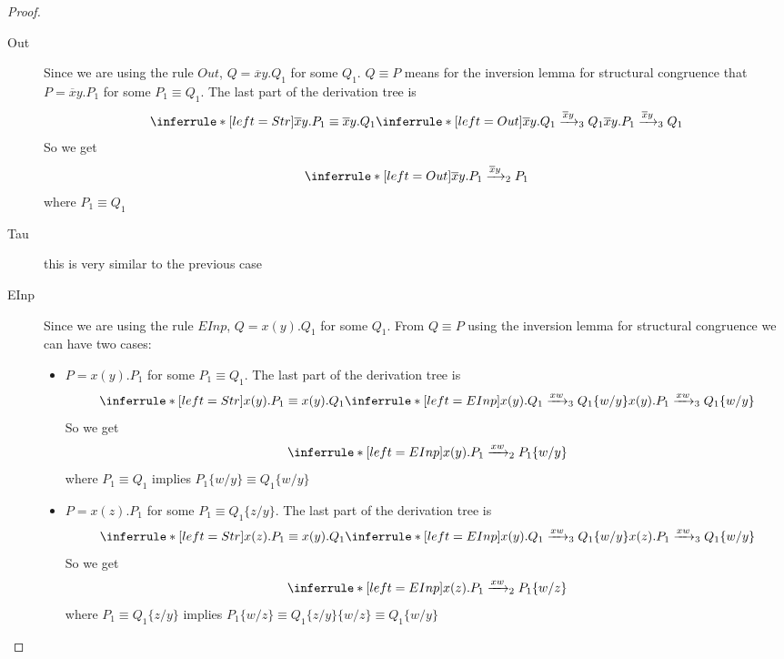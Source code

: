 \begin{theorem}
\begin{proof}
\begin{description}
\begin{description}
\begin{itemize}
		\begin{description}
		  \item[Out]
		    Since we are using the rule $Out$, $Q=\overline{x}y.Q_{1}$ for some $Q_{1}$. $Q\equiv P$ means for the inversion lemma for structural congruence that $P=\overline{x}y.P_{1}$ for some $P_{1}\equiv Q_{1}$. The last part of the derivation tree is 
		    \[
		      \inferrule* [left=Str]{
			  \overline{x}y.P_{1}\equiv \overline{x}y.Q_{1}
			\\
			  \inferrule* [left=Out]{
			  }{
			    \overline{x}y.Q_{1}\xrightarrow{\overline{x}y}_{3}Q_{1}
			  }
		      }{
			\overline{x}y.P_{1}\xrightarrow{\overline{x}y}_{3}Q_{1}
		      }
		    \]
		    So we get 
		    \[
		      \inferrule* [left=Out]{
		      }{
			\overline{x}y.P_{1}\xrightarrow{\overline{x}y}_{2}P_{1}
		      }
		    \]
		    where $P_{1}\equiv Q_{1}$
		  \item[Tau] this is very similar to the previous case
		  \item[EInp]
		    Since we are using the rule $EInp$, $Q=x(y).Q_{1}$ for some $Q_{1}$. From $Q\equiv P$ using the inversion lemma for structural congruence we can have two cases:
		    \begin{itemize}
		      \item 
			$P=x(y).P_{1}$ for some $P_{1}\equiv Q_{1}$. The last part of the derivation tree is 
			\[
			  \inferrule* [left=Str]{
			      x(y).P_{1}\equiv x(y).Q_{1}
			    \\
			      \inferrule* [left=EInp]{
			      }{
				x(y).Q_{1}\xrightarrow{xw}_{3}Q_{1}\{w/y\}
			      }
			  }{
			    x(y).P_{1}\xrightarrow{xw}_{3}Q_{1}\{w/y\}
			  }
			\]
			So we get 
			\[
			  \inferrule* [left=EInp]{
			  }{
			    x(y).P_{1}\xrightarrow{xw}_{2}P_{1}\{w/y\}
			  }
			\]
			where $P_{1}\equiv Q_{1}$ implies $P_{1}\{w/y\}\equiv Q_{1}\{w/y\}$
		      \item
			$P=x(z).P_{1}$ for some $P_{1}\equiv Q_{1}\{z/y\}$. The last part of the derivation tree is 
			\[
			  \inferrule* [left=Str]{
			      x(z).P_{1}\equiv x(y).Q_{1}
			    \\
			      \inferrule* [left=EInp]{
			      }{
				x(y).Q_{1}\xrightarrow{xw}_{3}Q_{1}\{w/y\}
			      }
			  }{
			    x(z).P_{1}\xrightarrow{xw}_{3}Q_{1}\{w/y\}
			  }
			\]
			So we get 
			\[
			  \inferrule* [left=EInp]{
			  }{
			    x(z).P_{1}\xrightarrow{xw}_{2}P_{1}\{w/z\}
			  }
			\]
			where $P_{1}\equiv Q_{1}\{z/y\}$ implies $P_{1}\{w/z\}\equiv Q_{1}\{z/y\}\{w/z\}\equiv Q_{1}\{w/y\}$
		    \end{itemize}

\end{description}
\end{itemize}
\end{description}
\end{description}
\end{proof}
\end{theorem}
